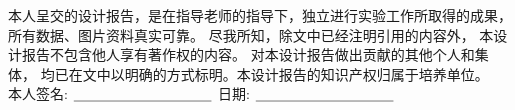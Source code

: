 


\newpage
\thispagestyle{empty}
\vspace*{20pt}
\begin{center}{}\end{center}
\par\vspace*{30pt}
\renewcommand{\baselinestretch}{2}

{%

本人呈交的设计报告，是在指导老师的指导下，独立进行实验工作所取得的成果，
所有数据、图片资料真实可靠。 尽我所知，除文中已经注明引用的内容外，
本设计报告不包含他人享有著作权的内容。
对本设计报告做出贡献的其他个人和集体，
均已在文中以明确的方式标明。本设计报告的知识产权归属于培养单位。\\[2cm]

\hspace*{1cm}本人签名: $\underline{\hspace{3.5cm}}$
\hspace{2cm}日期: $\underline{\hspace{3.5cm}}$\hfill\par}
\baselineskip=23pt  %





